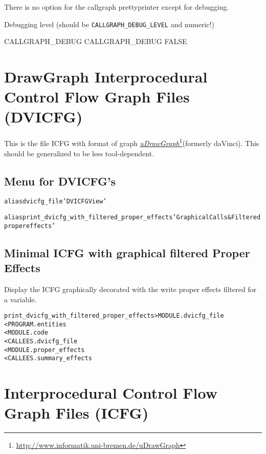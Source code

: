 \documentclass[a4paper]{report}
\newenvironment{PipsMake}{\begin{alltt}}{\end{alltt}}
\newenvironment{PipsPass}[1]{\label{pass:#1}}{}
\newcommand{\LINK}[2]{\href{#2}{#1}\footnote{\url{#2}}\xspace}
\newcommand{\PuDrawGraph}{\LINK{\emph{uDrawGraph}}{http://www.informatik.uni-bremen.de/uDrawGraph}\xspace}
\begin{document}
There is no option for the callgraph prettyprinter except
for debugging.

Debugging level (should be \verb+CALLGRAPH_DEBUG_LEVEL+ and numeric!)

\begin{PipsProp}{CALLGRAPH_DEBUG}
CALLGRAPH_DEBUG FALSE
\end{PipsProp}

\section{DrawGraph Interprocedural Control Flow Graph Files (DVICFG)}

\begin{PipsPass}{dvicfg_file}
This is the file ICFG with format of graph \PuDrawGraph (formerly
daVinci). This should be generalized to be less tool-dependent.

\end{PipsPass}

\subsection{Menu for DVICFG's}
\begin{PipsMake}
alias dvicfg_file 'DVICFG View'

alias print_dvicfg_with_filtered_proper_effects 'Graphical Calls & Filtered proper effects'
\end{PipsMake}

\subsection{Minimal ICFG with graphical filtered Proper Effects}
\begin{PipsPass}{print_dvicfg_with_filtered_proper_effects}
Display the ICFG graphically decorated with the write proper effects filtered for a variable.
\end{PipsPass}
\begin{PipsMake}
print_dvicfg_with_filtered_proper_effects           > MODULE.dvicfg_file
        < PROGRAM.entities
        < MODULE.code
        < CALLEES.dvicfg_file
        < MODULE.proper_effects
        < CALLEES.summary_effects
\end{PipsMake}

\section{Interprocedural Control Flow Graph Files (ICFG)}
\end{document}
